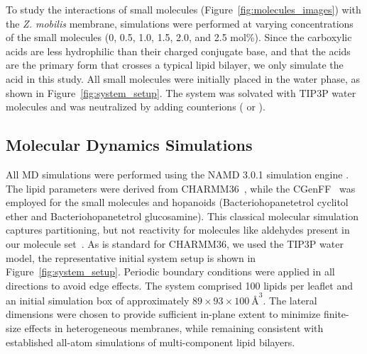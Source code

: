 To study the interactions of small molecules (Figure~\ref{fig:molecules_images}) with the \textit{Z. mobilis} membrane, simulations were performed at varying concentrations of the small molecules (0, 0.5, 1.0, 1.5, 2.0, and 2.5 mol\%).
Since the carboxylic acids are less hydrophilic than their charged conjugate base, and that the acids are the primary form that crosses a typical lipid bilayer\cite{Lee2016,Vermaas2019a,Raza2023}, we only simulate the acid in this study.
All small molecules were initially placed in the water phase, as shown in Figure~\ref{fig:system_setup}.
The system was solvated with TIP3P water molecules and was neutralized by adding counterions ( or ).



\subsection*{Molecular Dynamics Simulations}
All MD simulations were performed using the NAMD 3.0.1 simulation engine \cite{Phillips2020}. 
The lipid parameters were derived from CHARMM36~\cite{Yu2020}, while the CGenFF~\cite{Vanommeslaeghe2010} was employed for the small molecules and hopanoids (Bacteriohopanetetrol cyclitol ether and Bacteriohopanetetrol glucosamine).
This classical molecular simulation captures partitioning, but not reactivity for molecules like aldehydes present in our molecule set~\cite{Farah2012}.
As is standard for CHARMM36\cite{Yu2020}, we used the TIP3P water model\cite{Jorgensen1983}, the representative initial system setup is shown in Figure~\ref{fig:system_setup}.
Periodic boundary conditions were applied in all directions to avoid edge effects. 
The system comprised 100 lipids per leaflet and an initial simulation box of approximately $89 \times 93 \times 100~\text{\AA}^3$. 
The lateral dimensions were chosen to provide sufficient in-plane extent to minimize finite-size effects in heterogeneous membranes, while remaining consistent with established all-atom simulations of multi-component lipid bilayers\cite{Gupta2016,Choe2024,Rice2025}.

